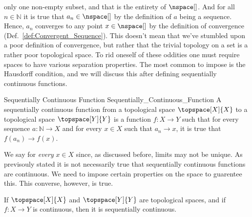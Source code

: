         only one non-empty subset, and that is the entirety of $\nspace[]$.
        And for all $n\in\mathbb{N}$ it is true that $a_{n}\in\nspace[]$ by
        the definition of $a$ being a sequence. Hence, $a_{n}$ converges to
        any point $x\in\nspace[]$ by the definition of convergence
        (Def.~\ref{def:Convergent_Sequence}). This doesn't mean that we've
        stumbled upon a poor definition of convergence, but rather that the
        trivial topology on a set is a rather poor topological space. To rid
        oneself of these oddities one must require spaces to have various
        separation properties. The most common to impose is the Hausdorff
        condition, and we will discuss this after defining sequentially
        continuous functions.
        \begin{fdefinition}{Sequentially Continuous Function}
                           {Sequentially_Continuous_Function}
            A sequentially continuous function from a topological space
            $\topspace[X]{X}$ to a topological space $\topspace[Y]{Y}$ is a
            function $f:X\rightarrow{Y}$ such that for every sequence
            $a:\mathbb{N}\rightarrow{X}$ and for every $x\in{X}$ such that
            $a_{n}\rightarrow{x}$, it is true that
            $f(a_{n})\rightarrow{f}(x)$.
        \end{fdefinition}
        We say for \textit{every} $x\in{X}$ since, as discussed before,
        limits may not be unique. As previsouly stated it is not necessarily
        true that sequentially continuous functions are continuous. We need
        to impose certain properties on the space to guarentee this. This
        converse, however, is true.
        \begin{theorem}
            \label{thm:Cont_is_Seq_Cont}%
            If $\topspace[X]{X}$ and $\topspace[Y]{Y}$ are topological
            spaces, and if $f:X\rightarrow{Y}$ is continuous, then it is
            sequentially continuous.
        \end{theorem}
